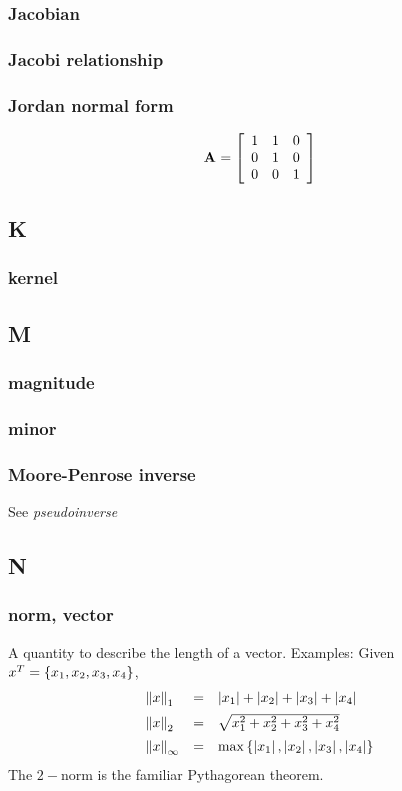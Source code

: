 \subsubsection*{Jacobian}

\subsubsection*{Jacobi relationship}

\subsubsection*{Jordan normal form}
\begin{equation}
  \A{} = 
  \mat{ccc}{
  1 & 1 & 0 \\
  0 & 1 & 0 \\
  0 & 0 & 1
  }
\end{equation}


\subsection*{K} 

\subsubsection*{kernel}

\subsection*{M} 

\subsubsection*{magnitude}

\subsubsection*{minor}

\subsubsection*{Moore-Penrose inverse}
See {\it pseudoinverse}

\subsection*{N} 

\subsubsection*{norm, vector}
A quantity to describe the length of a vector.
Examples: Given $x^T=\lst{x_1,x_2,x_3,x_4}$,
$$
\begin{array}{ lcl }
    \normo{x}   &=& \abs{x_1}+\abs{x_2}+\abs{x_3}+\abs{x_4} \\[5pt]
    \normt{x}   &=& \sqrt{x_1^2+x_2^2+x_3^2+x_4^2} \\[5pt]
    \norminf{x} &=& \mx \lst{\abs{x_1},\abs{x_2},\abs{x_3},\abs{x_4}} \\
\end{array}
$$
The $2-$norm is the familiar Pythagorean theorem.

